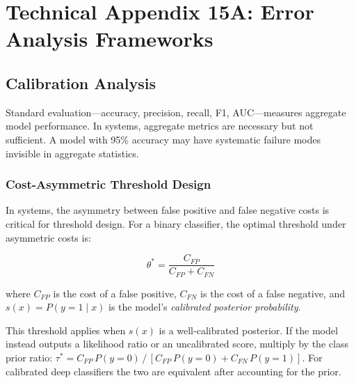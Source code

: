 
\chapter*{Technical Appendix 15A: Error Analysis Frameworks}
\label{app:ch15}

\apxnumon
\section{Calibration Analysis}

Standard \ml evaluation---accuracy, precision, recall, F1, AUC---measures aggregate model performance. In \hitl systems, aggregate metrics are necessary but not sufficient. A model with 95\% accuracy may have systematic failure modes invisible in aggregate statistics.

\subsection{Cost-Asymmetric Threshold Design}

In \hitl systems, the asymmetry between false positive and false negative costs is critical for threshold design. For a binary classifier, the optimal threshold under asymmetric costs is:

\begin{equation}
\theta^* = \frac{C_{FP}}{C_{FP} + C_{FN}}
\label{eq:optimal-threshold}
\end{equation}

where $C_{FP}$ is the cost of a false positive, $C_{FN}$ is the cost of a false negative, and $s(x) = P(y{=}1 \mid x)$ is the model's \emph{calibrated posterior probability}.

\begin{technote}
This threshold applies when $s(x)$ is a well-calibrated posterior. If the model instead outputs a likelihood ratio or an uncalibrated score, multiply by the class prior ratio: $\tau^* = C_{FP}\,P(y{=}0)\,/\,[C_{FP}\,P(y{=}0) + C_{FN}\,P(y{=}1)]$. For calibrated deep classifiers the two are equivalent after accounting for the prior.
\end{technote}

